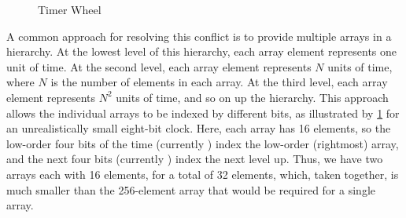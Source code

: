 \begin{figure}[tb]
\centering
{}
\caption{Timer Wheel}
\label{fig:advsync:Timer Wheel}
\end{figure}

A common approach for resolving this conflict is to provide multiple
arrays in a hierarchy.
At the lowest level of this hierarchy, each array element represents
one unit of time.
At the second level, each array element represents $N$ units of time,
where $N$ is the number of elements in each array.
At the third level, each array element represents $N^2$ units of time,
and so on up the hierarchy.
This approach allows the individual arrays to be indexed by different
bits, as illustrated by
\cref{fig:advsync:Timer Wheel}
for an unrealistically small eight-bit clock.
Here, each array has 16 elements, so the low-order four bits of the time
(currently ) index the low-order (rightmost) array, and the
next four bits (currently ) index the next level up.
Thus, we have two arrays each with 16 elements, for a total of 32 elements,
which, taken together, is much smaller than the 256-element array that
would be required for a single array.

